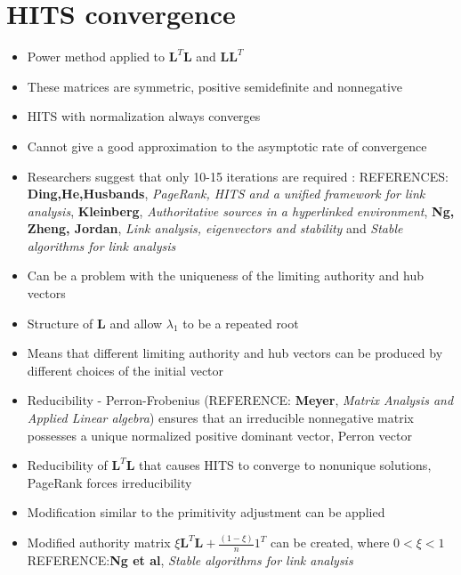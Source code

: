 \documentclass[11pt]{report}
\begin{document}
\section{HITS convergence}
\begin{itemize}
\item Power method applied to $\textbf{L}^T\textbf{L}$ and $\textbf{LL}^T$
\item These matrices are symmetric, positive semidefinite and nonnegative
\item HITS with normalization always converges
\item Cannot give a good approximation to the asymptotic rate of convergence
\item Researchers suggest that only 10-15 iterations are required : REFERENCES: \textbf{Ding,He,Husbands}, \textit{PageRank, HITS and a unified framework for link analysis}, \textbf{Kleinberg}, \textit{Authoritative sources in a hyperlinked environment}, \textbf{Ng, Zheng, Jordan}, \textit{Link analysis, eigenvectors and stability} and \textit{Stable algorithms for link analysis}
\item Can be a problem with the uniqueness of the limiting authority and hub vectors
\item Structure of \textbf{L} and allow $\lambda_1$ to be a repeated root
\item Means that different limiting authority and hub vectors can be produced by different choices of the initial vector
\item Reducibility - Perron-Frobenius (REFERENCE: \textbf{Meyer}, \textit{Matrix Analysis and Applied Linear algebra}) ensures that an irreducible nonnegative matrix possesses a unique normalized positive dominant vector, Perron vector
\item Reducibility of $\textbf{L}^T\textbf{L}$ that causes HITS to converge to nonunique solutions, PageRank forces irreducibility
\item Modification similar to the primitivity adjustment can be applied
\item Modified authority matrix \(\xi\textbf{L}^T\textbf{L} +\frac{(1-\xi)}{n}1^T\) can be created, where $0<\xi<1$ REFERENCE:\textbf{Ng et al}, \textit{Stable algorithms for link analysis}
\end{itemize}
\end{document}
